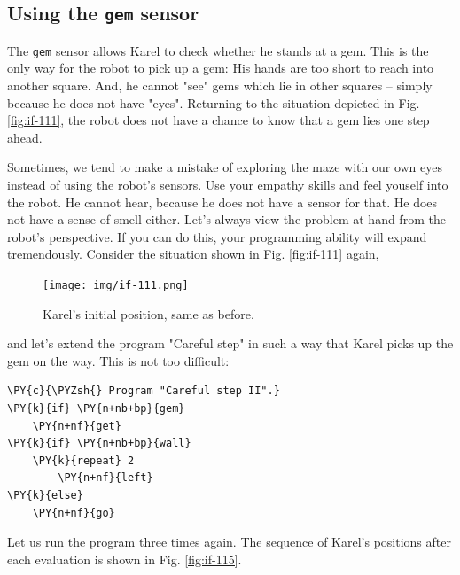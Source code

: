 \subsection{Using the {\tt gem} sensor}

The {\tt gem} sensor allows Karel to check whether he stands at a gem. 
This is the only way for the robot to pick up a gem: His hands are 
too short to reach into another square. And, he cannot "see" gems which 
lie in other squares -- simply because he does not have "eyes". Returning to 
the situation depicted in Fig. \ref{fig:if-111}, the robot does not have 
a chance to know that a gem lies one step ahead. 

Sometimes, we tend to make 
a mistake of exploring the maze with our own eyes instead of using the 
robot's sensors. Use your empathy skills and feel youself into the robot. 
He cannot hear, because he does not have a sensor for that. He does not 
have a sense of smell either. Let's always view the 
problem at hand from the robot's perspective. If you can do this, your 
programming ability will expand tremendously.
Consider the situation shown in Fig. \ref{fig:if-111} again,

\begin{figure}[!ht]
\begin{center}
\texttt{[image: img/if-111.png]}
\vspace{-0mm}
\caption{Karel's initial position, same as before.}
\label{fig:if-111b}
\vspace{-6mm}
\end{center}
\end{figure}
\noindent
and let's extend 
the program "Careful step" in such a way that Karel picks up the gem on
the way. This is not too difficult:\\

\begin{bbox}
\begin{Verbatim}[commandchars=\\\{\}]
\PY{c}{\PYZsh{} Program "Careful step II".}
\PY{k}{if} \PY{n+nb+bp}{gem}
    \PY{n+nf}{get}
\PY{k}{if} \PY{n+nb+bp}{wall}
    \PY{k}{repeat} 2
        \PY{n+nf}{left}
\PY{k}{else}
    \PY{n+nf}{go}
\end{Verbatim}
\end{bbox}
\vspace{6mm}

\noindent
Let us run the program three times again. The sequence of Karel's positions 
after each evaluation is shown in Fig. \ref{fig:if-115}.
\newpage

